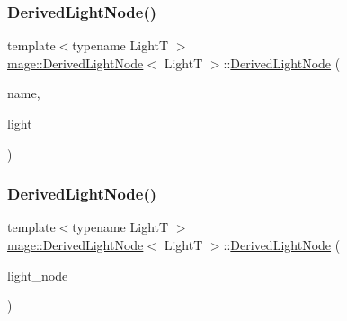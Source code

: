 \subsubsection{\texorpdfstring{Derived\+Light\+Node()}{DerivedLightNode()}\hspace{0.1cm}{\footnotesize\ttfamily [2/4]}}
{\footnotesize\ttfamily template$<$typename LightT $>$ \\
\hyperlink{classmage_1_1_derived_light_node}{mage\+::\+Derived\+Light\+Node}$<$ LightT $>$\+::\hyperlink{classmage_1_1_derived_light_node}{Derived\+Light\+Node} (\begin{DoxyParamCaption}\item[{const string \&}]{name,  }\item[{\hyperlink{namespacemage_a8c307fbcc33bce9b7f2aa4c26c3b95cf}{Unique\+Ptr}$<$ LightT $>$ \&\&}]{light }\end{DoxyParamCaption})\hspace{0.3cm}{\ttfamily [explicit]}}

\hypertarget{classmage_1_1_derived_light_node_a719b8fe088b93a7ecfb6d21b99cc170b}{}\label{classmage_1_1_derived_light_node_a719b8fe088b93a7ecfb6d21b99cc170b} 
\subsubsection{\texorpdfstring{Derived\+Light\+Node()}{DerivedLightNode()}\hspace{0.1cm}{\footnotesize\ttfamily [3/4]}}
{\footnotesize\ttfamily template$<$typename LightT $>$ \\
\hyperlink{classmage_1_1_derived_light_node}{mage\+::\+Derived\+Light\+Node}$<$ LightT $>$\+::\hyperlink{classmage_1_1_derived_light_node}{Derived\+Light\+Node} (\begin{DoxyParamCaption}\item[{const \hyperlink{classmage_1_1_derived_light_node}{Derived\+Light\+Node}$<$ LightT $>$ \&}]{light\+\_\+node }\end{DoxyParamCaption})}

\hypertarget{classmage_1_1_derived_light_node_af99017273f3f8bedcbd3842c31e4ecc4}{}\label{classmage_1_1_derived_light_node_af99017273f3f8bedcbd3842c31e4ecc4} 
